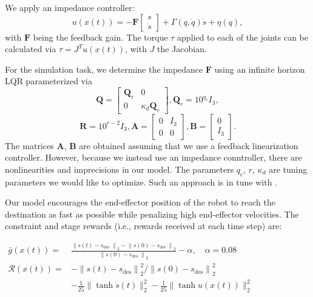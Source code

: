 We apply an impedance controller:
\begin{equation}
	u(x(t)) = -\boldsymbol{F}\begin{bmatrix}
		s\\
		\dot{s}
	\end{bmatrix} + \Gamma(q,\dot{q})\dot{s} + \eta(q),
\end{equation}
with $\boldsymbol{F}$ being the feedback gain.\textcolor{white}{"}The torque $\tau$ applied to each of the joints can be calculated via $\tau = J^Tu(x(t))$, with $J$ the Jacobian.\textcolor{white}{"}

For the simulation task, we determine the impedance $\boldsymbol{F}$ using an infinite horizon LQR parameterized via
\begin{equation*}
	\boldsymbol{Q} = \begin{bmatrix}
		\boldsymbol{Q}_r & 0\\
		0 & \kappa_d\boldsymbol{Q}_r
	\end{bmatrix}, \boldsymbol{Q}_r=10^{q_c}I_3,
\end{equation*}
\begin{equation*}
	 \boldsymbol{R}=10^{r-2}I_3,  \boldsymbol{A} = \begin{bmatrix}
	 	0 & I_3\\
	 	0 & 0
	 \end{bmatrix}, \boldsymbol{B}=\begin{bmatrix} 0\\I_3
	\end{bmatrix}.
\end{equation*}
The\textcolor{white}{"}matrices $\boldsymbol{A}$, $\boldsymbol{B}$ are obtained assuming that we use a feedback linearization controller. However, because we instead use an impedance conntroller, there are nonlinearities and imprecisions in our model.\textcolor{white}{"}The parameters $q_c$, $r$, $\kappa_d$ are tuning parameters we would like to optimize. Such an approach is in tune with \cite{LQR}.

Our model encourages the end-effector position of the robot to reach the destination as fast as possible while penalizing high end-effector velocities.
The constraint and stage rewards (i.e., rewards received at each time step) are:

\begin{center}
	$\begin{aligned}
	\bar{g}(x(t))=& \frac{\left\|s(t)-s_{\text {des }}\right\|_{2}-\left\|s(0)-s_{\text {des }}\right\|_{2}}{\left\|s(0)-s_{\text {des }}\right\|_{2}}-\alpha, \quad \alpha=0.08 \\
	\mathcal{R}(x(t))=&-\left\|s(t)-s_{\mathrm{des}}\right\|_{2}^{2} /\left\|s(0)-s_{\operatorname{des}}\right\|_{2}^{2} \\
	&-\frac{1}{25}\|\tanh \dot{s}(t)\|_{2}^{2}-\frac{1}{25}\|\tanh u(x(t))\|_{2}^{2}
	\end{aligned}$
\end{center}
 

